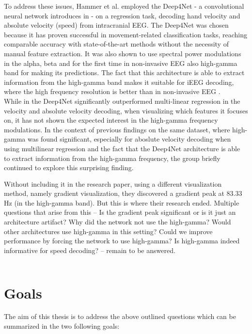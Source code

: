 To address these issues, Hammer et al. \cite{Hammer-2021} employed the Deep4Net - a convolutional neural network introduces in \cite{schirrmeister-deep-2017} - on a regression task, decoding hand velocity and absolute velocity (speed) from intracranial EEG. 
The Deep4Net was chosen because it has proven successful in movement-related classification tasks, reaching comparable accuracy with state-of-the-art methods without the necessity of manual feature extraction.
It was also shown to use spectral power modulations in the alpha, beta and for the first time in non-invasive EEG also high-gamma band for making its predictions. 
The fact that this architecture is able to extract information from the high-gamma band makes it suitable for iEEG decoding, where the high frequency resolution is better than in non-invasive EEG \cite{gamma-eeg-bad-resolution}. \\

While in \cite{Hammer-2021} the Deep4Net significantly outperformed multi-linear regression in the velocity and absolute velocity decoding, when visualizing which features it focuses on, it has not shown the expected interest in the high-gamma frequency modulations. 
In the context of previous findings on the same dataset, where high-gamma was found significant, especially for aboslute velocity decoding when using multilinear regression \cite{hammer-predominance-2016} and the fact that the Deep4Net architecture is able to extract information from the high-gamma frequency, the group briefly continued to explore this surprising finding.

Without including it in the research paper, using a different visualization method, namely gradient visualization, they discovered a gradient peak at 83.33~ Hz (in the high-gamma band).
But this is where their research ended. 
Multiple questions that arise from this -- Is the gradient peak significant or is it just an architecture artifact?
Why did the network not use the high-gamma?
Would other architectures use high-gamma in this setting?
Could we improve performance by forcing the network to use high-gamma?
Is high-gamma indeed informative for speed decoding? -- remain to be answered. \\
\\


\section*{Goals}
The aim of this thesis is to address the above outlined questions which can be summarized in the two following goals:

